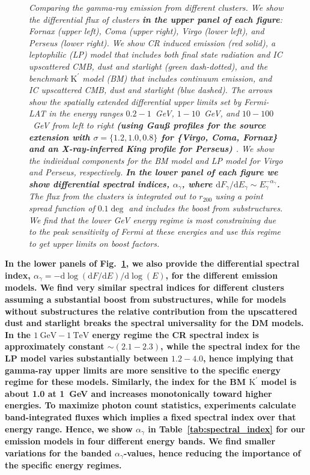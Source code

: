 \documentclass[10pt,aps,pra,reprint,amsmath,amsfonts,amssymb,showpacs,nofootinbib,floatfix]{revtex4-1}
\def\C#1{{\bf #1}}
\newcommand{\Fermi}{{\em Fermi}\xspace}
\newcommand{\rmn}{\mathrm}
\newcommand{\Kp}{\rmn{K}^\prime}
\newcommand{\gev}{\rmn{GeV}}
\newcommand{\tev}{\rmn{TeV}}
\newcommand{\dd}{\rmn{d}}
\newcommand{\rvir}{r_{200}}
\begin{document}
\begin{figure}
\begin{minipage}{2.0\columnwidth}
\caption{\it Comparing the gamma-ray emission from different
  clusters. We show the differential flux of clusters \C{in the upper
    panel of each figure}: Fornax (upper left), Coma (upper right),
  Virgo (lower left), and Perseus (lower right). We show CR induced
  emission (red solid), a leptophilic (LP) model that includes both
  final state radiation and IC upscattered CMB, dust and starlight
  (green dash-dotted), and the benchmark $\Kp$ model (BM) that
  includes continuum emission, and IC upscattered CMB, dust and
  starlight (blue dashed). The arrows show the spatially extended
  differential upper limits set by \Fermi-LAT in the energy ranges
  $0.2-1$~GeV, $1-10$~GeV, and $10-100$~GeV from left to right
  \C{(using Gau{\ss} profiles for the source extension with
    $\sigma=\{1.2,1.0,0.8\}$ for \{Virgo, Coma, Fornax\} and an
    X-ray-inferred King profile for Perseus)
    \cite{2010ApJ...717L..71A}}. We show the individual components for
  the BM model and LP model for Virgo and Perseus, respectively. \C{In
    the lower panel of each figure we show differential spectral
    indices, $\alpha_\gamma$, where $\dd F_\gamma/\dd E_\gamma \sim
    E_\gamma^{-\alpha_\gamma}$.}  The flux from the clusters is
  integrated out to $\rvir$ using a point spread function of $0.1\deg$
  and includes the boost from substructures. We find that the lower
  GeV energy regime is most constraining due to the peak sensitivity
  of \Fermi at these energies and use this regime to get upper limits
  on boost factors.}
 \label{fig:clu_comp}
\end{minipage}
\end{figure}

\C{In the lower panels of Fig.~\ref{fig:clu_comp}, we also provide the
  differential spectral index, $\alpha_\gamma=-\dd \log(\dd F/\dd
  E)/\dd \log(E)$, for the different emission models. We find very
  similar spectral indices for different clusters assuming a
  substantial boost from substructures, while for models without
  substructures the relative contribution from the upscattered dust
  and starlight breaks the spectral universality for the DM models. In
  the $1~\gev-1~\tev$ energy regime the CR spectral index is
  approximately constant $\sim (2.1-2.3)$, while the spectral index
  for the LP model varies substantially between $1.2-4.0$, hence
  implying that gamma-ray upper limits are more sensitive to the
  specific energy regime for these models. Similarly, the index for
  the BM $\Kp$ model is about 1.0 at 1~GeV and increases monotonically
  toward higher energies. To maximize photon count statistics,
  experiments calculate band-integrated fluxes which implies a fixed
  spectral index over that energy range. Hence, we show $\alpha_\gamma$ in
  Table~\ref{tab:spectral_index} for our emission models in four
  different energy bands. We find smaller variations for the banded
  $\alpha_\gamma$-values, hence reducing the importance of the specific
  energy regimes.}
\end{document}
